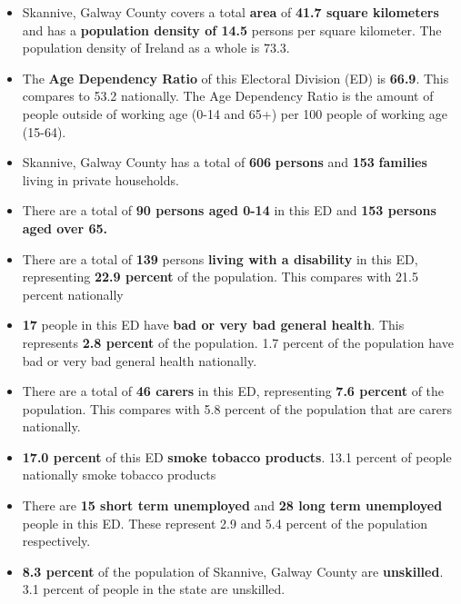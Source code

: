 \documentclass{article}
\begin{document}
\begin{itemize}

\item Skannive, Galway County covers a total \textbf{area} of  \textbf{41.7 square kilometers} and has a \textbf{population density of 14.5} persons per square kilometer. The population density of Ireland as a whole is  73.3. 

\item The \textbf{Age Dependency Ratio} of this Electoral Division (ED) is  \textbf{66.9}. This compares to 53.2 nationally. The Age Dependency Ratio is the amount of people outside of working age (0-14 and 65+) per 100 people of working age (15-64). 

\item Skannive, Galway County has a total of \textbf{606} \textbf{persons} and  \textbf{153} \textbf{families} living in private households.

\item There are a total of \textbf{90 persons aged 0-14} in this ED and \textbf{153 persons aged over 65.} 

\item There are a total of \textbf{139} persons \textbf{living with a disability} in this ED, representing \textbf{22.9 percent} of the population. This compares with  21.5 percent nationally

\item \textbf{17} people in this ED have \textbf{bad or very bad general health}. This represents \textbf{2.8 percent} of the population. 1.7 percent of the population have bad or very bad general health nationally. 

\item There are a total of \textbf{46 carers} in this ED, representing \textbf{7.6 percent} of the population. This compares with 5.8 percent of the population that are carers nationally. 

\item \textbf{17.0 percent} of this ED \textbf{smoke tobacco products}. 13.1 percent of people nationally smoke tobacco products

\item There are \textbf{15 short term unemployed} and \textbf{28 long term unemployed} people in this ED. These represent 2.9 and 5.4 percent of the population respectively.

\item  \textbf{8.3 percent} of the population of Skannive, Galway County are \textbf{unskilled}. 3.1 percent of people in the state are unskilled.


\end{itemize}
\end{document}
